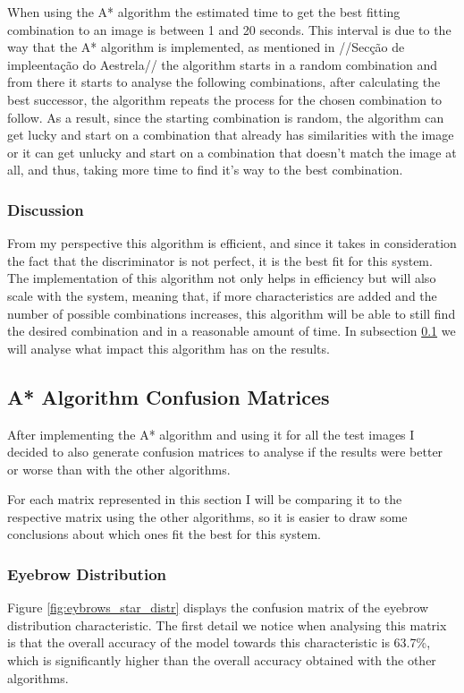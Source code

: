 \documentclass[12pt,a4paper,oneside]{memoir}
\begin{document}
\par
When using the A* algorithm the estimated time to get the best fitting combination to an image is between 1 and 20 seconds. This interval is due to the way that the A* algorithm is implemented, as mentioned in //Secção de impleentação do Aestrela// the algorithm starts in a random combination and from there it starts to analyse the following combinations, after calculating the best successor, the algorithm repeats the process for the chosen combination to follow. As a result, since the starting combination is random, the algorithm can get lucky and start on a combination that already has similarities with the image or it can get unlucky and start on a combination that doesn't match the image at all, and thus, taking more time to find it's way to the best combination.

\subsubsection{Discussion}
From my perspective this algorithm is efficient, and since it takes in consideration the fact that the discriminator is not perfect, it is the best fit for this system. The implementation of this algorithm not only helps in efficiency but will also scale with the system, meaning that, if more characteristics are added and the number of possible combinations increases, this algorithm will be able to still find the desired combination and in a reasonable amount of time. In subsection \ref{ss:astaralg} we will analyse what impact this algorithm has on the results.

\subsection{A* Algorithm Confusion Matrices}
\label{ss:astaralg}
After implementing the A* algorithm and using it for all the test images I decided to also generate confusion matrices to analyse if the results were better or worse than with the other algorithms. 
\par
For each matrix represented in this section I will be comparing it to the respective matrix using the other algorithms, so it is easier to draw some conclusions about which ones fit the best for this system.


\subsubsection{Eyebrow Distribution}
Figure \ref{fig:eybrows_star_distr} displays the confusion matrix of the eyebrow distribution characteristic. The first detail we notice when analysing this matrix is that the overall accuracy of the model towards this characteristic is 63.7\%, which is significantly higher than the overall accuracy obtained with the other algorithms. 
\end{document}
